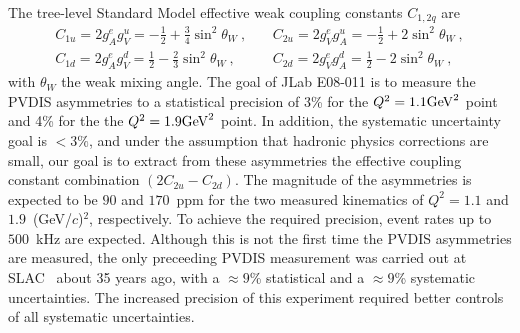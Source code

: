 The tree-level Standard Model effective weak coupling constants $C_{1,2q}$ are
\begin{eqnarray}
 C_{1u} = 2g^e_A g^u_V= -\frac{1}{2} + \frac{3}{4} \sin^2\theta_{W}~,
 && ~C_{2u} = 2g^e_V g^u_A= - \frac{1}{2} + 2 \sin^2\theta_{W}~,\nonumber\\
 C_{1d} = 2g^e_A g^d_V= \frac{1}{2} - \frac{2}{3} \sin^2\theta_{W}~,
 && ~C_{2d} = 2g^e_V g^d_A=  \frac{1}{2} - 2 \sin^2\theta_{W}~,\nonumber
\end{eqnarray}
with $\theta_W$ the weak mixing angle. 
The goal of JLab E08-011 is to measure the PVDIS asymmetries to a statistical precision of 
3\% for the $Q^2 = 1.1 {\rm GeV}^2$ point and 4\% for the the $Q^2 = 1.9 {\rm GeV}^2$ point.
In addition, the systematic uncertainty goal is $<3\%$, 
and under the assumption that hadronic physics corrections are small, 
our goal is to extract from these asymmetries the effective coupling 
constant combination $(2C_{2u} - C_{2d})$. 
The magnitude of the asymmetries is expected to be $90$ and $170$~ppm for the two
measured kinematics of $Q^2=1.1$ and $1.9$~(GeV/$c$)$^2$, respectively. 
To achieve the required precision, event rates up to $500$~kHz are expected.
%
Although this is not the first time the PVDIS asymmetries are measured, the only
preceeding PVDIS measurement was carried out at SLAC~\cite{Prescott:1978tm,Prescott:1979dh}
about 35 years ago, with a $\approx 9$\% statistical and a $\approx 9$\% systematic uncertainties. 
The increased precision of this experiment required better controls of all systematic
uncertainties.
